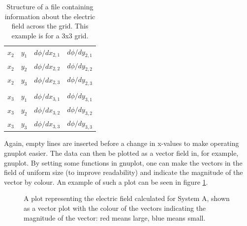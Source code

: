 \documentclass[12pt, a4paper]{article}
\begin{document}
\begin{table}
{\begin{tabularx}{0.44\textwidth}{ |XXXX| }
        $x_2$ & $y_1$ & $d{\phi}/dx_{2,1}$ & $d{\phi}/dy_{2,1}$ \\
        $x_2$ & $y_2$ & $d{\phi}/dx_{2,2}$ & $d{\phi}/dy_{2,2}$ \\
        $x_2$ & $y_3$ & $d{\phi}/dx_{2,3}$ & $d{\phi}/dy_{2,3}$ \\
        & & & \\
        $x_3$ & $y_1$ & $d{\phi}/dx_{3,1}$ & $d{\phi}/dy_{3,1}$ \\
        $x_3$ & $y_2$ & $d{\phi}/dx_{3,2}$ & $d{\phi}/dy_{3,2}$ \\
        $x_3$ & $y_3$ & $d{\phi}/dx_{3,3}$ & $d{\phi}/dy_{3,3}$ \\
        \hline
    \end{tabularx}
    \label{table:field_data}
    \caption{Structure of a file containing information about the electric field across the grid. This example is for a 3x3 grid.}
    }
\end{table}

Again, empty lines are inserted before a change in x-values to make operating gnuplot easier. The data can then be plotted as a vector field in, for example, gnuplot. By setting some functions in gnuplot, one can make the vectors in the field of uniform size (to improve readability) and indicate the magnitude of the vector by colour. An example of such a plot can be seen in figure \ref{fig:vectorfieldplot}.

\begin{figure}[h!]
    \centering
    \setlength\fboxsep{0pt}
    \setlength\fboxrule{0.5pt}
    \caption{A plot representing the electric field calculated for System A, shown as a vector plot with the colour of the vectors indicating the magnitude of the vector: red means large, blue means small.}
    \label{fig:vectorfieldplot}
\end{figure}
 
\end{document}
